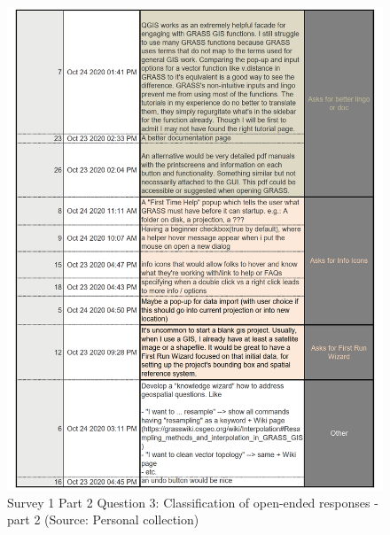 \documentclass[a4paper,10pt,twoside]{article}
\begin{document}
\newpage
\vspace{0.3cm}
\begin{figure}[hbt!] 
\begin{center}
\includegraphics[width=16.5cm]{../surveys/analyzed_data/survey1_part2_question3_open_ended-2_3} 
\caption[Survey 1 Part 2 Question 3: Classification of open-ended responses - part 2]{Survey 1 Part 2 Question 3: Classification of open-ended responses - part 2 (Source: Personal collection)}
\label{fig:survey1_part2_question3_open_ended-2_1}
\end{center}
\end{figure}
\end{document}
